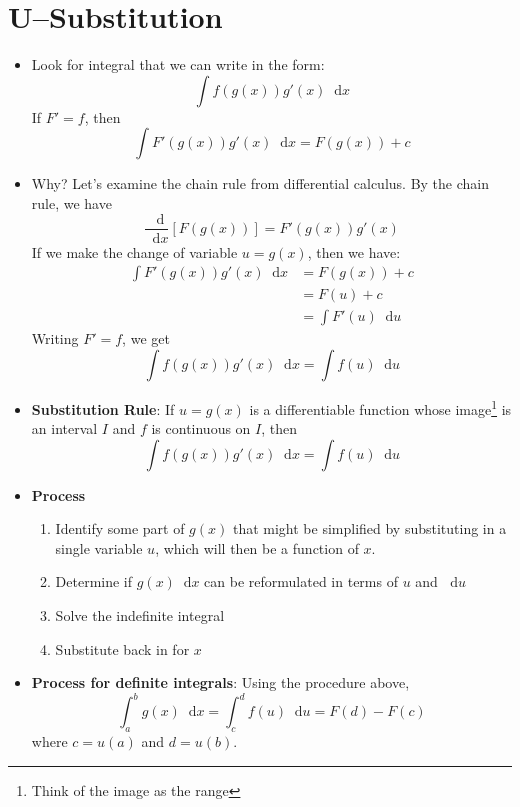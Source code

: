 \documentclass[11pt]{article}
\theoremstyle{definition}
\theoremstyle{remark}
\newcommand*\diff{\mathop{}\!\mathrm{d}}
\begin{document}
\section{U--Substitution}
\begin{itemize}
\item Look for integral that we can write in the form:
$$
\int f(g(x))g'(x) \diff x
$$
If $F'=f$, then 
$$
\int F'(g(x))g'(x) \diff x = F(g(x)) + c
$$
\item Why? Let's examine the chain rule from differential calculus. By the chain rule, we have
$$
\frac{\diff}{\diff x}[F(g(x))] = F'(g(x))g'(x)
$$
If we make the change of variable $u = g(x)$, then we have:
\begin{align*}
\int F'(g(x))g'(x) \diff x &= F(g(x)) + c \\
&= F(u) + c \\
&= \int F'(u) \diff u 
\end{align*}
Writing $F' = f$, we get
$$
\int f(g(x))g'(x) \diff x = \int f(u) \diff u
$$
\item \textbf{Substitution Rule}: If $u=g(x)$ is a differentiable function whose image\footnote{Think of the image as the range} is an interval $I$ and $f$ is continuous on $I$, then
$$
\int f(g(x))g'(x)\diff x = \int f(u) \diff u 
$$
\item \textbf{Process}
\begin{enumerate}
\item Identify some part of $g(x)$ that might be simplified by substituting in a single variable $u$, which will then be a function of $x$.
\item Determine if $g(x) \diff x$ can be reformulated in terms of $u$ and $\diff u$
\item Solve the indefinite integral
\item Substitute back in for $x$
\end{enumerate}
\item \textbf{Process for definite integrals}: Using the procedure above,
$$
\int_a^b g(x) \diff x = \int_c^d f(u) \diff u = F(d) - F(c)
$$
where $c=u(a)$ and $d=u(b)$.
\end{itemize}
\end{document}

